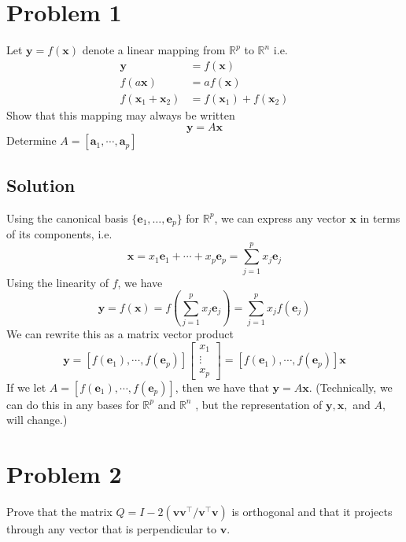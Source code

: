 \documentclass[a4paper]{article}
\begin{document}
\section*{Problem 1}%
Let $\mathbf{y} = f(\mathbf{x})$ denote a linear mapping from $\mathds{R}^p$ to $\mathds{R}^n$ i.e.
\[
  \begin{aligned}
    \mathbf{y} &= f(\mathbf{x}) \\
    f(a \mathbf{x}) &= a f(\mathbf{x}) \\
    f(\mathbf{x}_1 + \mathbf{x}_2) &= f(\mathbf{x}_1) + f(\mathbf{x}_2)
  \end{aligned}
\]
Show that this mapping may always be written
\[
  \mathbf{y} = A\mathbf{x}
\]
Determine $A = [\mathbf{a}_1, \cdots, \mathbf{a}_p]$

\subsection*{Solution}%
Using the canonical basis $\{\mathbf{e}_1, \dots, \mathbf{e}_p\}$ for  $\mathds{R}^p$, we can express any vector $\mathbf{x}$ in terms of its components, i.e.
\[
  \mathbf{x} = x_1\mathbf{e}_1 + \cdots + x_p\mathbf{e}_p = \sum_{j=1}^p x_j\mathbf{e}_j
\]
Using the linearity of $f$, we have
\[
  \mathbf{y} = f(\mathbf{x}) = f \left( \sum_{j=1}^p x_j\mathbf{e}_j\right) = \sum_{j=1}^p x_jf(\mathbf{e}_j)
\]
We can rewrite this as a matrix vector product
\[
  \mathbf{y} = [f(\mathbf{e}_1), \cdots, f(\mathbf{e}_p)]
  \begin{bmatrix}
    x_1 \\
    \vdots  \\
    x_p
  \end{bmatrix}
  =[f(\mathbf{e}_1), \cdots, f(\mathbf{e}_p)]\mathbf{x}
\]
If we let $A = [f(\mathbf{e}_1), \cdots, f(\mathbf{e}_p)]$, then we have that $\mathbf{y} = A\mathbf{x}$. (Technically, we can do this in any bases for $\mathds{R}^p$ and $\mathds{R}^n$ , but the representation of $\mathbf{y}, \mathbf{x},$ and $A$, will change.)

\section*{Problem 2}%
Prove that the matrix $Q = I - 2(\mathbf{v}\mathbf{v}^{\top}/\mathbf{v}^{\top}\mathbf{v})$ is orthogonal and that it projects through any vector that is perpendicular to $\mathbf{v}$.
\end{document}
